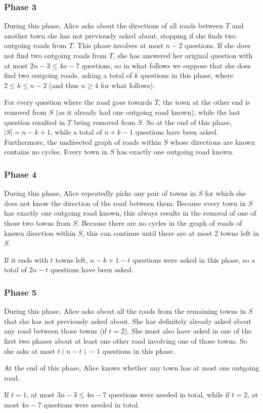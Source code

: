 \subsubsection*{Phase 3}
During this phase, Alice asks about the directions of all roads between $T$ and another town she has not previously asked about, stopping if she finds two outgoing roads from $T$. This phase involves at most $n - 2$ questions. If she does not find two outgoing roads from $T$, she has answered her original question with at most $2n - 3 \leq 4n - 7$ questions, so in what follows we suppose that she does find two outgoing roads, asking a total of $k$ questions in this phase, where $2 \leq k \leq n - 2$ (and thus $n \geq 4$ for what follows).

For every question where the road goes towards $T$, the town at the other end is removed from $S$ (as it already had one outgoing road known), while the last question resulted in $T$ being removed from $S$. So at the end of this phase, $|S| = n - k + 1$, while a total of $n + k - 1$ questions have been asked. Furthermore, the undirected graph of roads within $S$ whose directions are known contains no cycles. Every town in $S$ has exactly one outgoing road known.

\subsubsection*{Phase 4}
During this phase, Alice repeatedly picks any pair of towns in $S$ for which she does not know the direction of the road between them. Because every town in $S$ has exactly one outgoing road known, this always results in the removal of one of those two towns from $S$. Because there are no cycles in the graph of roads of known direction within $S$, this can continue until there are at most 2 towns left in $S$.

If it ends with $t$ towns left, $n - k + 1 - t$ questions were asked in this phase, so a total of $2n - t$ questions have been asked.

\subsubsection*{Phase 5}
During this phase, Alice asks about all the roads from the remaining towns in $S$ that she has not previously asked about. She has definitely already asked about any road between those towns (if $t = 2$). She must also have asked in one of the first two phases about at least one other road involving one of those towns. So she asks at most $t(n - t) - 1$ questions in this phase.

At the end of this phase, Alice knows whether any town has at most one outgoing road.

If $t = 1$, at most $3n - 3 \leq 4n - 7$ questions were needed in total, while if $t = 2$, at most $4n - 7$ questions were needed in total.